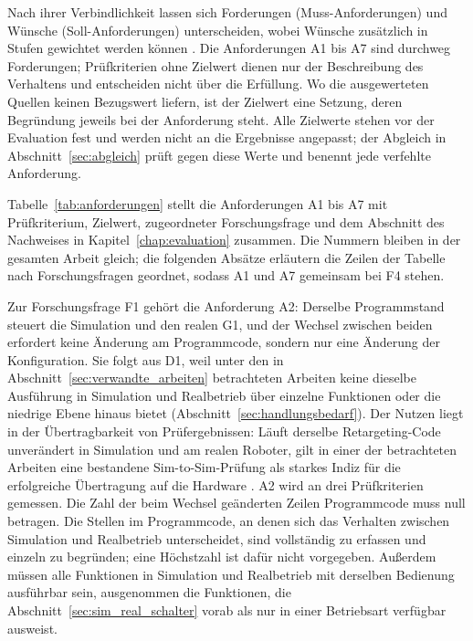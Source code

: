 Nach ihrer Verbindlichkeit lassen sich Forderungen (Muss-Anforderungen) und Wünsche (Soll-Anforderungen) unterscheiden, wobei Wünsche zusätzlich in Stufen gewichtet werden können \cite{Bender2021}.
Die Anforderungen A1 bis A7 sind durchweg Forderungen; Prüfkriterien ohne Zielwert dienen nur der Beschreibung des Verhaltens und entscheiden nicht über die Erfüllung.
Wo die ausgewerteten Quellen keinen Bezugswert liefern, ist der Zielwert eine Setzung, deren Begründung jeweils bei der Anforderung steht.
Alle Zielwerte stehen vor der Evaluation fest und werden nicht an die Ergebnisse angepasst; der Abgleich in Abschnitt~\ref{sec:abgleich} prüft gegen diese Werte und benennt jede verfehlte Anforderung.

Tabelle~\ref{tab:anforderungen} stellt die Anforderungen A1 bis A7 mit Prüfkriterium, Zielwert, zugeordneter Forschungsfrage und dem Abschnitt des Nachweises in Kapitel~\ref{chap:evaluation} zusammen.
Die Nummern bleiben in der gesamten Arbeit gleich; die folgenden Absätze erläutern die Zeilen der Tabelle nach Forschungsfragen geordnet, sodass A1 und A7 gemeinsam bei F4 stehen.


Zur Forschungsfrage F1 gehört die Anforderung A2: Derselbe Programmstand steuert die Simulation und den realen G1, und der Wechsel zwischen beiden erfordert keine Änderung am Programmcode, sondern nur eine Änderung der Konfiguration.
Sie folgt aus D1, weil unter den in Abschnitt~\ref{sec:verwandte_arbeiten} betrachteten Arbeiten keine dieselbe Ausführung in Simulation und Realbetrieb über einzelne Funktionen oder die niedrige Ebene hinaus bietet (Abschnitt~\ref{sec:handlungsbedarf}).
Der Nutzen liegt in der Übertragbarkeit von Prüfergebnissen: Läuft derselbe Retargeting-Code unverändert in Simulation und am realen Roboter, gilt in einer der betrachteten Arbeiten eine bestandene Sim-to-Sim-Prüfung als starkes Indiz für die erfolgreiche Übertragung auf die Hardware \cite{Durrani2026}.
A2 wird an drei Prüfkriterien gemessen.
Die Zahl der beim Wechsel geänderten Zeilen Programmcode muss null betragen. %
Die Stellen im Programmcode, an denen sich das Verhalten zwischen Simulation und Realbetrieb unterscheidet, sind vollständig zu erfassen und einzeln zu begründen; eine Höchstzahl ist dafür nicht vorgegeben. %
Außerdem müssen alle Funktionen in Simulation und Realbetrieb mit derselben Bedienung ausführbar sein, ausgenommen die Funktionen, die Abschnitt~\ref{sec:sim_real_schalter} vorab als nur in einer Betriebsart verfügbar ausweist. %


